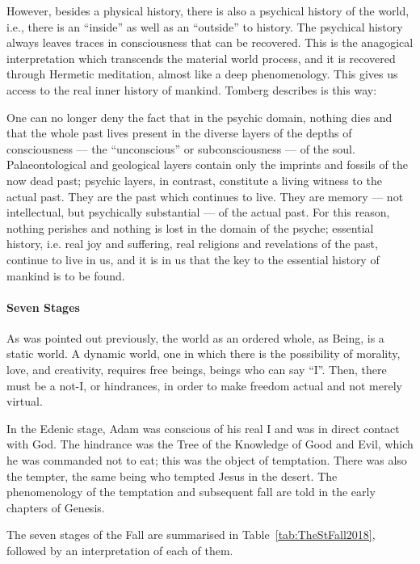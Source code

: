 However, besides a physical history, there is also a psychical history of the world, i.e., there is an “inside” as well
as an “outside” to history. The psychical history always leaves traces in consciousness that can be recovered. This is
the anagogical interpretation which transcends the material world process, and it is recovered through Hermetic
meditation, almost like a deep phenomenology. This gives us access to the real inner history of mankind. Tomberg
describes is this way:

\begin{quotex}
One can no longer deny the fact that in the psychic domain, nothing dies and that the whole past lives present in the
diverse layers of the depths of consciousness — the “unconscious” or subconsciousness — of the
soul. Palaeontological and geological layers contain only the imprints and fossils of the now dead past; psychic
layers, in contrast, constitute a living witness to the actual past. They are the past which continues to live. They
are memory — not intellectual, but psychically substantial — of the actual past. For this
reason, nothing perishes and nothing is lost in the domain of the psyche; essential history, i.e. real joy and
suffering, real religions and revelations of the past, continue to live in us, and it is in us that the key to the
essential history of mankind is to be found. 

\end{quotex}
\paragraph{Seven Stages}
As was pointed out previously, the world as an ordered whole, as Being, is a static world. A dynamic world, one in which
there is the possibility of morality, love, and creativity, requires free beings, beings who can say “I”. Then, there
must be a not-I, or hindrances, in order to make freedom actual and not merely virtual.

In the Edenic stage, Adam was conscious of his real I and was in direct contact with God. The hindrance was the Tree of
the Knowledge of Good and Evil, which he was commanded not to eat; this was the object of temptation. There was also
the tempter, the same being who tempted Jesus in the desert. The phenomenology of the temptation and subsequent fall
are told in the early chapters of Genesis.

The seven stages of the Fall are summarised in Table~\ref{tab:TheStFall2018}, followed by an interpretation of each of them.

